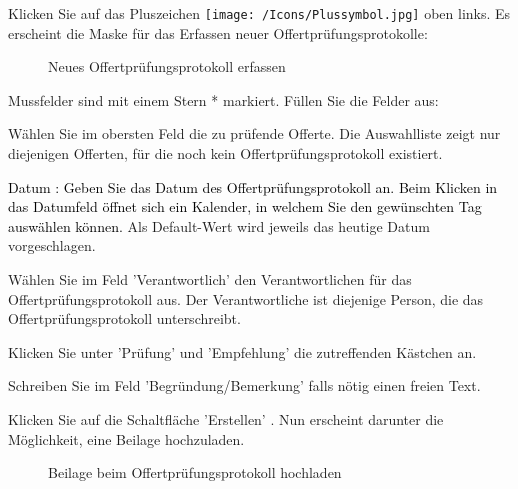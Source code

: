 Klicken Sie auf das Pluszeichen \texttt{[image: /Icons/Plussymbol.jpg]}  oben links. Es erscheint die Maske für das Erfassen neuer Offertprüfungsprotokolle:

\begin{figure}[H]
\caption{Neues Offertprüfungsprotokoll erfassen}
\end{figure}

Mussfelder sind mit einem Stern * markiert. Füllen Sie die Felder aus:

\vspace{\baselineskip}

\begin{compactitem}
\item
Wählen Sie im obersten Feld die zu prüfende Offerte. Die Auswahlliste  zeigt nur diejenigen Offerten, für die noch kein Offertprüfungsprotokoll existiert.
\item
\textcolor{black}{Datum } \textcolor{black}{: Geben Sie das Datum des Offertprüfungsprotokoll an. Beim Klicken in das Datumfeld öffnet sich ein Kalender, in welchem Sie den gewünschten Tag auswählen können. }Als Default-Wert wird jeweils das heutige Datum vorgeschlagen.
\item
Wählen Sie im Feld 'Verantwortlich'  den Verantwortlichen für das Offertprüfungsprotokoll aus. Der Verantwortliche ist diejenige Person, die das Offertprüfungsprotokoll unterschreibt.
\item {\sffamily
Klicken Sie unter 'Prüfung'  und 'Empfehlung'  die zutreffenden Kästchen an.}
\item
Schreiben Sie im Feld 'Begründung/Bemerkung'  falls nötig einen freien Text.
\end{compactitem}

\vspace{\baselineskip}

Klicken Sie auf die Schaltfläche 'Erstellen' . Nun erscheint darunter die Möglichkeit, eine Beilage hochzuladen.

\begin{figure}[H]
\caption{Beilage beim Offertprüfungsprotokoll hochladen}
\end{figure}

